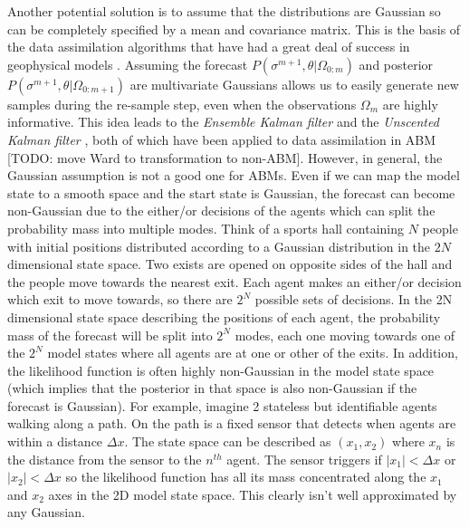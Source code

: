 \documentclass{article}
\begin{document}
Another potential solution is to assume that the distributions are Gaussian so can be completely specified by a mean and covariance matrix. This is the basis of the data assimilation algorithms that have had a great deal of success in geophysical models \citet*{carrassi2018data, talagrand_assimilation_1997, kalnay_atmospheric_2003, lewis_dynamic_2006}. Assuming the forecast $P(\sigma^{m+1},\theta|\Omega_{0:m})$ and posterior $P(\sigma^{m+1},\theta|\Omega_{0:m+1})$ are multivariate Gaussians allows us to easily generate new samples during the re-sample step, even when the observations $\Omega_m$ are highly informative. This idea leads to the \textit{Ensemble Kalman filter} \citep{evensen2003ensemble} and the \textit{Unscented Kalman filter} \citep{wan2001unscented}, both of which have been applied to data assimilation in ABM \citep*{ward_dynamic_2016, clay_realtime_2020} [TODO: move Ward to transformation to non-ABM]. However, in general, the Gaussian assumption is not a good one for ABMs. Even if we can map the model state to a smooth space and the start state is Gaussian, the forecast can become non-Gaussian due to the either/or decisions of the agents which can split the probability mass into multiple modes. Think of a sports hall containing $N$ people with initial positions distributed according to a Gaussian distribution in the $2N$ dimensional state space. Two exists are opened on opposite sides of the hall and the people move towards the nearest exit. Each agent makes an either/or decision which exit to move towards, so there are $2^N$ possible sets of decisions. In the 2N dimensional state space describing the positions of each agent, the probability mass of the forecast will be split into $2^N$ modes, each one moving towards one of the $2^N$ model states where all agents are at one or other of the exits. In addition, the likelihood function is often highly non-Gaussian in the model state space (which implies that the posterior in that space is also non-Gaussian if the forecast is Gaussian). For example, imagine 2 stateless but identifiable agents walking along a path. On the path is a fixed sensor that detects when agents are within a distance $\Delta x$. The state space can be described as $(x_1,x_2)$ where $x_n$ is the distance from the sensor to the $n^{th}$ agent. The sensor triggers if $|x_1|<\Delta x$ or $|x_2|<\Delta x$ so the likelihood function has all its mass concentrated along the $x_1$ and $x_2$ axes in the 2D model state space. This clearly isn't well approximated by any Gaussian.
\end{document}
